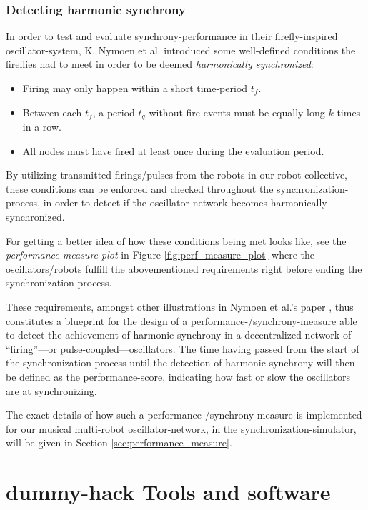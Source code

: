 			\subsection{Detecting harmonic synchrony}
			\label{subsec:harmonic_synchrony}
			In order to test and evaluate synchrony-performance in their firefly-inspired oscillator-system, K. Nymoen et al. \cite{nymoen_synch} introduced some well-defined conditions the fireflies had to meet in order to be deemed \textit{harmonically synchronized}:
			\begin{itemize}
				\item Firing may only happen within a short time-period $t_f$.
				\item Between each $t_f$, a period $t_q$ without fire events must be equally long $k$ times in a row.
				\item All nodes must have fired at least once during the evaluation period.
			\end{itemize}
			
			By utilizing transmitted firings/pulses from the robots in our robot-collective, these conditions can be enforced and checked throughout the synchronization-process, in order to detect if the oscillator-network becomes harmonically synchronized.
			
			For getting a better idea of how these conditions being met looks like, see the \textit{performance-measure plot} in Figure \ref{fig:perf_measure_plot} where the oscillators/robots fulfill the abovementioned requirements right before ending the synchronization process.
			
			These requirements, amongst other illustrations in Nymoen et al.'s paper \cite{nymoen_synch}, thus constitutes a blueprint for the design of a performance-/synchrony-measure able to detect the achievement of harmonic synchrony in a decentralized network of ``firing''—or pulse-coupled—oscillators. The time having passed from the start of the synchronization-process until the detection of harmonic synchrony will then be defined as the performance-score, indicating how fast or slow the oscillators are at synchronizing.
			
			The exact details of how such a performance-/synchrony-measure is implemented for our musical multi-robot oscillator-network, in the synchronization-simulator, will be given in Section \ref{sec:performance_measure}.
	
	\chapter{dummy-hack Tools and software}
	

